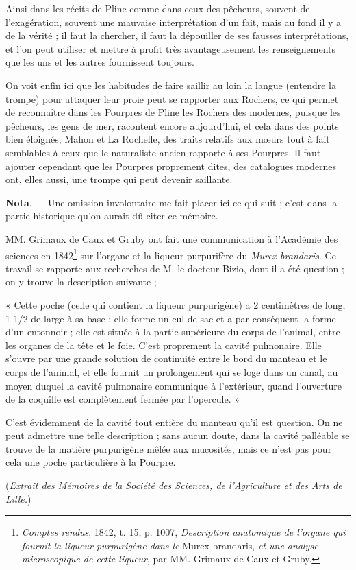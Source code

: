 \documentclass[a4paper, 11pt, oneside, polutonikogreek, french]{article}
\begin{document}
Ainsi dans les récits de Pline comme dans ceux des pêcheurs, souvent de l'exagération, souvent une mauvaise interprétation d'un fait, mais au fond il y a de la vérité ; il faut la chercher, il faut la dépouiller de ses fausses interprétations, et l'on peut utiliser et mettre à profit très avantageusement les renseignements que les uns et les autres fournissent toujours.

On voit enfin ici que les habitudes de faire saillir au loin la langue (entendre la trompe) pour attaquer leur proie peut se rapporter aux Rochers, ce qui permet de reconnaître dans les Pourpres de Pline les Rochers des modernes, puisque les pêcheurs, les gens de mer, racontent encore aujourd'hui, et cela dans des points bien éloignés, Mahon et La Rochelle, des traits relatifs aux mœurs tout à fait semblables à ceux que le naturaliste ancien rapporte à ses Pourpres. Il faut ajouter cependant que les Pourpres proprement dites, des catalogues modernes ont, elles aussi, une trompe qui peut devenir saillante.

\bigskip
\centerline{\EightStarTaper}
\centerline{\EightStarTaper\EightStarTaper}
\bigskip

\textbf{Nota}. --- Une omission involontaire me fait placer ici ce qui suit ; c'est dans la partie historique qu'on aurait dû citer ce mémoire.

MM. Grimaux de Caux et Gruby ont fait une communication à l'Académie des sciences en 1842\footnote{\emph{Comptes rendus}, 1842, t. 15, p. 1007, \emph{Description anatomique de l'organe qui fournit la liqueur purpurigène dans le} Murex brandaris, \emph{et une analyse microscopique de cette liqueur}, par MM. Grimaux de Caux et Gruby.} sur l'organe et la liqueur purpurifère du \emph{Murex brandaris}. Ce travail se rapporte aux recherches de M. le docteur Bizio, dont il a été question ; on y trouve la description suivante ;

« Cette poche (celle qui contient la liqueur purpurigène) a 2 centimètres de long, 1 1/2 de large à sa base ; elle forme un cul-de-sac et a par conséquent la forme d'un entonnoir ; elle est située à la partie supérieure du corps de l'animal, entre les organes de la tête et le foie. C'est proprement la cavité pulmonaire. Elle s'ouvre par une grande solution de continuité entre le bord du manteau et le corps de l'animal, et elle fournit un prolongement qui se loge dans un canal, au moyen duquel la cavité pulmonaire communique à l'extérieur, quand l'ouverture de la coquille est complètement fermée par l'opercule. »

C'est évidemment de la cavité tout entière du manteau qu'il est question. On ne peut admettre une telle description ; sans aucun doute, dans la cavité palléable se trouve de la matière purpurigène mêlée aux mucosités, mais ce n'est pas pour cela une poche particulière à la Pourpre.

(\emph{Extrait des Mémoires de la Société des Sciences, de l'Agriculture et des Arts de Lille.})
\end{document}
